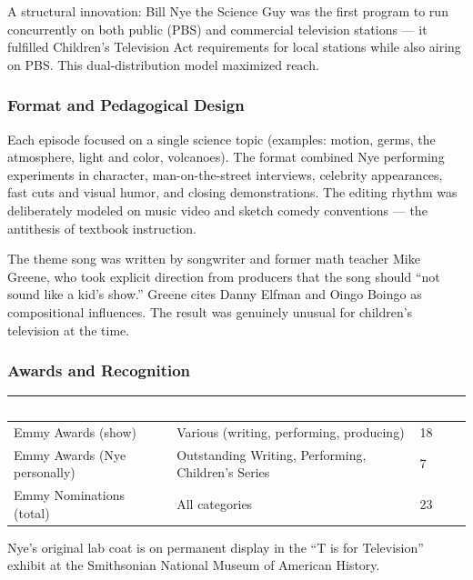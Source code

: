 \documentclass[11pt,letterpaper]{article}
\newcommand{\tableheader}[1]{\textbf{\sffamily\textcolor{white}{#1}}}
\begin{document}
A structural innovation: Bill Nye the Science Guy was the first program to run concurrently on both public (PBS) and commercial television stations --- it fulfilled Children's Television Act requirements for local stations while also airing on PBS. This dual-distribution model maximized reach.

\subsubsection{Format and Pedagogical Design}

Each episode focused on a single science topic (examples: motion, germs, the atmosphere, light and color, volcanoes). The format combined Nye performing experiments in character, man-on-the-street interviews, celebrity appearances, fast cuts and visual humor, and closing demonstrations. The editing rhythm was deliberately modeled on music video and sketch comedy conventions --- the antithesis of textbook instruction.

The theme song was written by songwriter and former math teacher Mike Greene, who took explicit direction from producers that the song should ``not sound like a kid's show.'' Greene cites Danny Elfman and Oingo Boingo as compositional influences. The result was genuinely unusual for children's television at the time.

\subsubsection{Awards and Recognition}

\begin{center}
\begin{tabularx}{\textwidth}{L{5cm}XC{2cm}}
\toprule
{}
\tableheader{Award} & \tableheader{Category} & \tableheader{Count} \\
\midrule
Emmy Awards (show) & Various (writing, performing, producing) & 18 \\
Emmy Awards (Nye personally) & Outstanding Writing, Performing, Children's Series & 7 \\
Emmy Nominations (total) & All categories & 23 \\
\bottomrule
\end{tabularx}
\end{center}

Nye's original lab coat is on permanent display in the ``T is for Television'' exhibit at the Smithsonian National Museum of American History.
\end{document}
